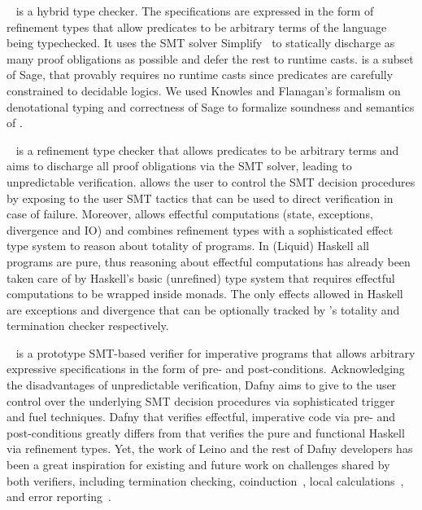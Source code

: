 ~\cite{Knowles10} is a hybrid type checker. 
The specifications are expressed in the form of refinement types 
that allow predicates to
be arbitrary terms of the language being typechecked. 
It uses the SMT solver Simplify~\cite{simplifyj} to statically discharge 
as many proof obligations as possible and defer the rest to runtime casts. 
%
\toolname is a subset of Sage, that provably requires no runtime casts
since predicates are carefully constrained to decidable logics. 
%
We used Knowles and Flanagan's formalism on denotational typing 
and correctness of Sage to formalize soundness and semantics of \toolname.  
 

\mypara{\fstar}~\cite{fstar} is a refinement type checker 
that allows predicates to be arbitrary terms 
and aims to discharge all proof obligations via the SMT solver, 
leading to unpredictable verification. 
%
\fstar allows the user to control the SMT decision procedures 
by exposing to the user SMT tactics that can be used to direct
verification in case of failure. 
% 
Moreover, \fstar allows effectful computations 
(\eg state, exceptions, divergence and IO)
and combines refinement types with a sophisticated effect type system 
to reason about totality of programs. 
%
In (Liquid) Haskell all programs are pure, thus reasoning about effectful
computations has already been taken care of by Haskell's basic (\ie unrefined) 
type system that requires effectful computations to be wrapped inside monads. 
% 
The only effects allowed in Haskell are exceptions and divergence 
that can be optionally tracked by \toolname's totality and termination checker respectively. 


~\cite{dafny} is a prototype SMT-based verifier 
for imperative programs that allows arbitrary expressive specifications 
in the form of pre- and post-conditions. 
%
Acknowledging the disadvantages of unpredictable verification, 
Dafny aims to give to the user control over the underlying SMT 
decision procedures 
via sophisticated trigger and fuel techniques. 
%
Dafny
that verifies effectful, imperative code via pre- and post-conditions
greatly differs from \toolname
that verifies the pure and functional Haskell via refinement types. 
%
Yet, the work of Leino and the rest of Dafny developers 
has been a great inspiration for existing and future work 
on challenges shared by both verifiers, 
including termination checking, 
coinduction~\cite{LeinoM14}, 
local calculations~\cite{LeinoPolikarpova16}, 
and error reporting~\cite{GouesLM11}. 


